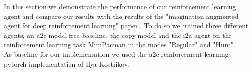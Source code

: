 In this section we demonstrate the performance of our reinforcement learning agent and compare our results with the results of the "imagination augmented agent for deep reinforcement learning" paper \cite{I2A}.
To do so we trained three different agents, an a2c model-free baseline, the copy model and the i2a agent on the reinforcement learning task MiniPacman in the modes "Regular" and "Hunt".\\

As baseline for our implementation we used the a2c reinforcement learning pytorch implementation of Ilya Kostrikov\cite{pytorchrl}.

